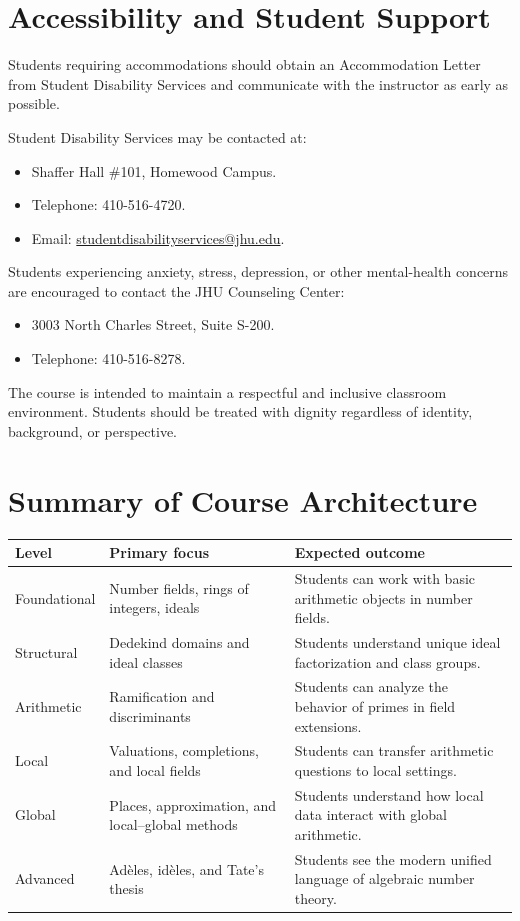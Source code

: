 \documentclass[11pt]{article}
\begin{document}
\section{Accessibility and Student Support}

Students requiring accommodations should obtain an Accommodation Letter from
Student Disability Services and communicate with the instructor as early as
possible.

Student Disability Services may be contacted at:

\begin{itemize}
    \item Shaffer Hall \#101, Homewood Campus.
    \item Telephone: 410-516-4720.
    \item Email:
    \href{mailto:studentdisabilityservices@jhu.edu}
    {studentdisabilityservices@jhu.edu}.
\end{itemize}

Students experiencing anxiety, stress, depression, or other mental-health
concerns are encouraged to contact the JHU Counseling Center:

\begin{itemize}
    \item 3003 North Charles Street, Suite S-200.
    \item Telephone: 410-516-8278.
\end{itemize}

The course is intended to maintain a respectful and inclusive classroom
environment. Students should be treated with dignity regardless of identity,
background, or perspective.

\section{Summary of Course Architecture}

\begin{center}
\begin{tabular}{p{} p{} p{}}
\toprule
\textbf{Level} & \textbf{Primary focus} & \textbf{Expected outcome} \\
\midrule
Foundational &
Number fields, rings of integers, ideals &
Students can work with basic arithmetic objects in number fields. \\
Structural &
Dedekind domains and ideal classes &
Students understand unique ideal factorization and class groups. \\
Arithmetic &
Ramification and discriminants &
Students can analyze the behavior of primes in field extensions. \\
Local &
Valuations, completions, and local fields &
Students can transfer arithmetic questions to local settings. \\
Global &
Places, approximation, and local--global methods &
Students understand how local data interact with global arithmetic. \\
Advanced &
Adèles, idèles, and Tate's thesis &
Students see the modern unified language of algebraic number theory. \\
\bottomrule
\end{tabular}
\end{center}
\end{document}
